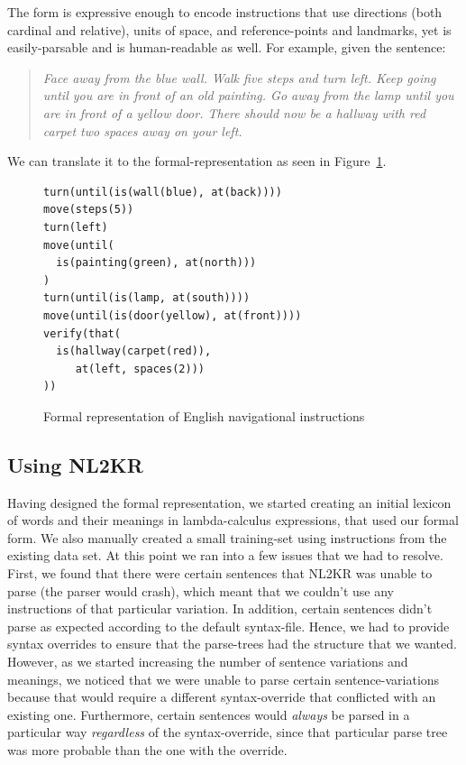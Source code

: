 \documentclass[11pt,letterpaper]{article}
\begin{document}
The form is expressive enough to encode instructions that use directions (both cardinal and relative), units of space, and reference-points and landmarks, yet is easily-parsable and is human-readable as well. For example, given the sentence:
\begin{quote}
\textit{Face away from the blue wall. Walk five steps and turn left. Keep going until you are in front of an old painting. Go away from the lamp until you are in front of a yellow door. There should now be a hallway with red carpet two spaces away on your left.}
\end{quote}

We can translate it to the formal-representation as seen in Figure~\ref{fig:formal}.
\begin{figure}
\begin{Verbatim}[fontfamily=courier,fontsize=\footnotesize,fontseries=b]
turn(until(is(wall(blue), at(back))))
move(steps(5))
turn(left)
move(until(
  is(painting(green), at(north)))
)
turn(until(is(lamp, at(south))))
move(until(is(door(yellow), at(front))))
verify(that(
  is(hallway(carpet(red)), 
     at(left, spaces(2)))
))
\end{Verbatim}
\caption{Formal representation of English navigational instructions}\label{fig:formal}
\end{figure}

\subsection{Using NL2KR}\label{ssec:usingnl2kr}

Having designed the formal representation, we started creating an initial lexicon of words and their meanings in lambda-calculus expressions, that used our formal form. We also manually created a small training-set using instructions from the existing data set. At this point we ran into a few issues that we had to resolve. First, we found that there were certain sentences that NL2KR was unable to parse (the parser would crash), which meant that we couldn't use any instructions of that particular variation. In addition, certain sentences didn't parse as expected according to the default syntax-file. Hence, we had to provide syntax overrides to ensure that the parse-trees had the structure that we wanted. However, as we started increasing the number of sentence variations and meanings, we noticed that we were unable to parse certain sentence-variations because that would require a different syntax-override that conflicted with an existing one. Furthermore, certain sentences would \textit{always} be parsed in a particular way \textit{regardless} of the syntax-override, since that particular parse tree was more probable than the one with the override.
\end{document}
